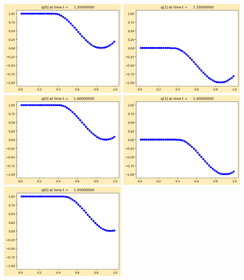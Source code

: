 \documentclass[11pt]{article}
\begin{document}
\vskip 10pt 
\includegraphics[width=0.475\textwidth]{frame0027fig0.png}
\includegraphics[width=0.475\textwidth]{frame0027fig1.png}
\vskip 10pt 
\includegraphics[width=0.475\textwidth]{frame0028fig0.png}
\includegraphics[width=0.475\textwidth]{frame0028fig1.png}
\vskip 10pt 
\includegraphics[width=0.475\textwidth]{frame0029fig0.png}
\end{document}
